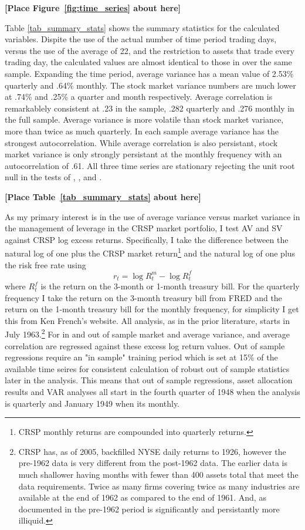 \bigskip
\centerline{\bf [Place Figure~\ref{fig:time_series} about here]}
\bigskip
Table \ref{tab_summary_stats} shows the summary statistics for the calculated variables. Dispite the use of the actual number of time period trading days, versus the use of the average of 22, and the restriction to assets that trade every trading day, the calculated values are almost identical to those in \citet{pollet_average_2010} over the same sample. Expanding the time period, average variance has a mean value of 2.53\% quarterly and .64\% monthly. The stock market variance numbers are much lower at .74\% and .25\% a quarter and month respectively. Average correlation is remarkablely consistent at .23 in the \cite{pollet_average_2010} sample, .282 quarterly and .276 monthly in the full sample. Average variance is more volatile than stock market variance, more than twice as much quarterly. In each sample average variance has the strongest autocorrelation. While average correlation is also persistant, stock market variance is only strongly persistant at the monthly frequency with an autocorrelation of .61. All three time series are stationary rejecting the unit root null in the tests of \citet{dickey_distribution_1979}, \citet{Ng2001}, and \citet{ers1996}.\\
\bigskip
\centerline{\bf [Place Table~\ref{tab_summary_stats} about here]}
\bigskip

As my primary interest is in the use of average variance versus market variance in the management of leverage in the CRSP market portfolio, I test AV and SV against CRSP log excess returns. Specifically, I take the difference between the natural log of one plus the CRSP market return\footnote{CRSP monthly returns are compounded into quarterly returns.} and the natural log of one plus the risk free rate using
\begin{equation}
	r_{t} = \log R^{m}_{t} - \log R^{f}_{t} 
\end{equation}
where $R^{f}_{t}$ is the return on the 3-month or 1-month treasury bill.
For the quarterly frequency I take the return on the 3-month treasury bill from FRED and the return on the 1-month treasury bill for the monthly frequency, for simplicity I get this from Ken French's website. All analysis, as in the prior literature, starts in July 1963.\footnote{CRSP has, as of 2005, backfilled NYSE daily returns to 1926, however the pre-1962 data is very different from the post-1962 data. The earlier data is much shallower having months with fewer than 400 assets total that meet the data requirements. Twice as many firms covering twice as many industries are available at the end of 1962 as compared to the end of 1961. And, as documented in \citet{jones_century_2002} the pre-1962 period is significantly and persistantly more illiquid.}  For in and out of sample market and average variance, and average correlation are regressed against these excess log return values. Out of sample regressions require an "in sample" training period which is set at 15\% of the available time seires for consistent calculation of robust out of sample statistics later in the analysis. This means that out of sample regressions, asset allocation results and VAR analyses all start in the fourth quarter of 1948 when the analysis is quarterly and January 1949 when its monthly.